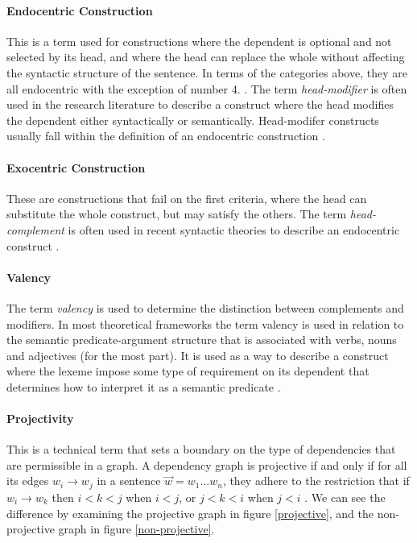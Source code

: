 \paragraph{Endocentric Construction} This is a term used for constructions where the dependent is optional and not selected by its head, and where the head can replace the whole without affecting the syntactic structure of the sentence. In terms of the categories above, they are all endocentric with the exception of number 4. \cite{KublerEtAl:09}. The term \textit{head-modifier} is often used in the research literature to describe a construct where the head modifies the dependent either syntactically or semantically. Head-modifer constructs usually fall within the definition of an endocentric construction \cite{Niv:05}.

\paragraph{Exocentric Construction} These are constructions that fail on the first criteria, where the head can substitute the whole construct, but may satisfy the others. The term \textit{head-complement} is often used in recent syntactic theories to describe an endocentric construct \cite{Niv:05}.

\paragraph{Valency} The term \textit{valency} is used to determine the distinction between complements and modifiers. In most theoretical frameworks the term valency is used in relation to the semantic predicate-argument structure that is associated with verbs, nouns and adjectives (for the most part). It is used as a way to describe a construct where the lexeme impose some type of requirement on its dependent that determines how to interpret it as a semantic predicate \cite{Niv:05}.

\paragraph{Projectivity} This is a technical term that sets a boundary on the type of dependencies that are permissible in a graph. A dependency graph is projective if and only if for all its edges $w_i \rightarrow w_j$ in a sentence $\vec{w} = w_1 ... w_n$, they adhere to the restriction that if $w_i \rightarrow w_k$ then $i < k < j$ when $i < j$, or $j < k < i$ when $j < i$ \cite{KublerEtAl:09}. We can see the difference by examining the projective graph in figure \ref{projective}, and the non-projective graph in figure \ref{non-projective}.


